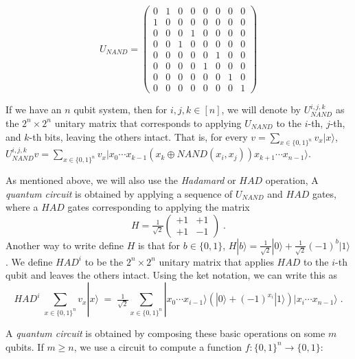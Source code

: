 \[
U_{NAND}  = \begin{pmatrix} 0 & 1 & 0 & 0 & 0 & 0 & 0 & 0 \\
                            1 & 0 & 0 & 0 & 0 & 0 & 0 & 0 \\
                            0 & 0 & 0 & 1 & 0 & 0 & 0 & 0 \\
                            0 & 0 & 1 & 0 & 0 & 0 & 0 & 0 \\
                            0 & 0 & 0 & 0 & 0 & 1 & 0 & 0 \\
                            0 & 0 & 0 & 0 & 1 & 0 & 0 & 0 \\
                            0 & 0 & 0 & 0 & 0 & 0 & 1 & 0 \\
                            0 & 0 & 0 & 0 & 0 & 0 & 0 & 1
\end{pmatrix}
\]

If we have an \(n\) qubit system, then for \(i,j,k \in [n]\), we will
denote by \(U_{NAND}^{i,j,k}\) as the \(2^n \times 2^n\) unitary matrix
that corresponds to applying \(U_{NAND}\) to the \(i\)-th, \(j\)-th, and
\(k\)-th bits, leaving the others intact. That is, for every
\(v = \sum_{x\in \{0,1\}^n} v_x |x \rangle\),
\(U_{NAND}^{i,j,k}v = \sum_{x\in \{0,1\}^n}v_x |x_0 \cdots x_{k-1}(x_k \oplus \ensuremath{\mathit{NAND}}(x_i,x_j))x_{k+1} \cdots x_{n-1} \rangle\).

As mentioned above, we will also use the \emph{Hadamard} or
\(\ensuremath{\mathit{HAD}}\) operation, A \emph{quantum circuit} is
obtained by applying a sequence of \(U_{NAND}\) and
\(\ensuremath{\mathit{HAD}}\) gates, where a
\(\ensuremath{\mathit{HAD}}\) gates corresponding to applying the matrix
\[H = \tfrac{1}{\sqrt{2}} \begin{pmatrix} +1 & +1\\ +1 & -1 \end{pmatrix} \;. \]
Another way to write define \(H\) is that for \(b \in \{0,1\}\),
\(H |b\rangle = \tfrac{1}{\sqrt{2}}|0\rangle + \tfrac{1}{\sqrt{2}} (-1)^b |1\rangle\).
We define \(\ensuremath{\mathit{HAD}}^i\) to be the \(2^n \times 2^n\)
unitary matrix that applies \(\ensuremath{\mathit{HAD}}\) to the
\(i\)-th qubit and leaves the others intact. Using the ket notation, we
can write this as \[
\ensuremath{\mathit{HAD}}^i \; \sum_{x\in \{0,1\}^n} v_x |x \rangle  \;=\; \tfrac{1}{\sqrt{2}}\sum_{x\in \{0,1\}^n}|x_0 \cdots x_{i-1}\rangle \left(|0\rangle + (-1)^{x_i}|1\rangle\right)|x_i \cdots x_{n-1} \rangle \;.
\]

A \emph{quantum circuit} is obtained by composing these basic operations
on some \(m\) qubits. If \(m \geq n\), we use a circuit to compute a
function \(f:\{0,1\}^n \rightarrow \{0,1\}\):

